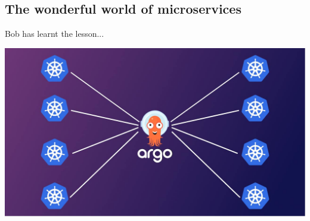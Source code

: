 \subsection{The wonderful world of microservices}
\begin{frame}{Bob has learnt the lesson...}
    \begin{center}
        \includegraphics[width=.9\textwidth]{./assets/argocd}
    \end{center}
\end{frame}


